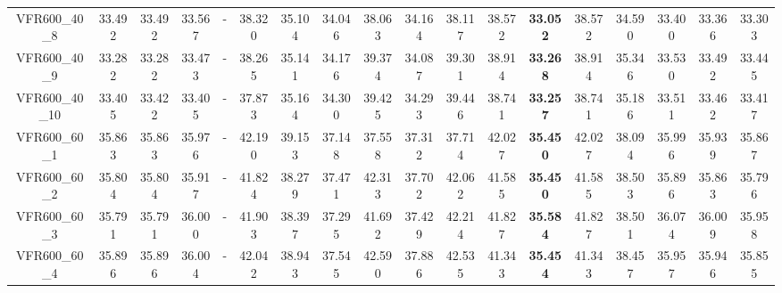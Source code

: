 \begin{tabular}{cc|ccc|ccccccccccccc}
VFR600\_40\_8      & 33.492           & 33.492           & 33.567           & -                & 38.320           & 35.104           & 34.046           & 38.063           & 34.164           & 38.117           & 38.572           & {\bf 33.052}     & 38.572           & 34.590           & 33.400           & 33.366           & 33.303          \\ 
VFR600\_40\_9      & 33.282           & 33.282           & 33.473           & -                & 38.265           & 35.141           & 34.176           & 39.374           & 34.087           & 39.301           & 38.914           & {\bf 33.268}     & 38.914           & 35.346           & 33.530           & 33.492           & 33.445          \\ 
VFR600\_40\_10     & 33.405           & 33.422           & 33.405           & -                & 37.873           & 35.164           & 34.300           & 39.425           & 34.293           & 39.446           & 38.741           & {\bf 33.257}     & 38.741           & 35.186           & 33.511           & 33.462           & 33.417          \\ 
VFR600\_60\_1      & 35.863           & 35.863           & 35.976           & -                & 42.190           & 39.153           & 37.148           & 37.558           & 37.312           & 37.714           & 42.027           & {\bf 35.450}     & 42.027           & 38.094           & 35.996           & 35.939           & 35.867          \\ 
VFR600\_60\_2      & 35.804           & 35.804           & 35.917           & -                & 41.824           & 38.279           & 37.471           & 42.313           & 37.702           & 42.062           & 41.585           & {\bf 35.450}     & 41.585           & 38.503           & 35.896           & 35.863           & 35.796          \\ 
VFR600\_60\_3      & 35.791           & 35.791           & 36.000           & -                & 41.903           & 38.397           & 37.295           & 41.692           & 37.429           & 42.214           & 41.827           & {\bf 35.584}     & 41.827           & 38.501           & 36.074           & 36.009           & 35.958          \\ 
VFR600\_60\_4      & 35.896           & 35.896           & 36.004           & -                & 42.042           & 38.943           & 37.545           & 42.590           & 37.886           & 42.535           & 41.343           & {\bf 35.454}     & 41.343           & 38.457           & 35.957           & 35.946           & 35.855          \\ 

\end{tabular}
